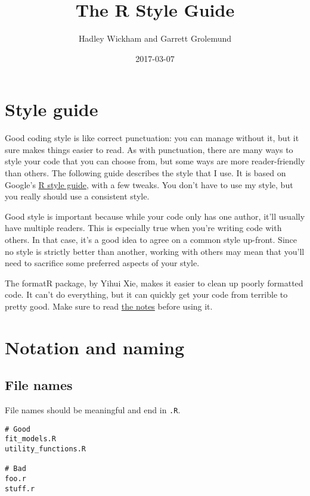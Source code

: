 \documentclass[]{book}
\title{The R Style Guide}
\author{Hadley Wickham and Garrett Grolemund}
\date{2017-03-07}
\begin{document}
\maketitle

{
\setcounter{tocdepth}{1}
\tableofcontents
}
\chapter{Style guide}\label{style}

Good coding style is like correct punctuation: you can manage without
it, but it sure makes things easier to read. As with punctuation, there
are many ways to style your code that you can choose from, but some ways
are more reader-friendly than others. The following guide describes the
style that I use. It is based on Google's
\href{http://google-styleguide.googlecode.com/svn/trunk/google-r-style.html}{R
style guide}, with a few tweaks. You don't have to use my style, but you
really should use a consistent style. 

Good style is important because while your code only has one author,
it'll usually have multiple readers. This is especially true when you're
writing code with others. In that case, it's a good idea to agree on a
common style up-front. Since no style is strictly better than another,
working with others may mean that you'll need to sacrifice some
preferred aspects of your style.

The formatR package, by Yihui Xie, makes it easier to clean up poorly
formatted code. It can't do everything, but it can quickly get your code
from terrible to pretty good. Make sure to read
\href{https://yihui.name/formatR/}{the notes} before using it.

\chapter{Notation and naming}\label{style-notnam}

\section{File names}\label{file-names}

File names should be meaningful and end in \texttt{.R}.

\begin{verbatim}
# Good
fit_models.R
utility_functions.R

# Bad
foo.r
stuff.r
\end{verbatim}
\end{document}
